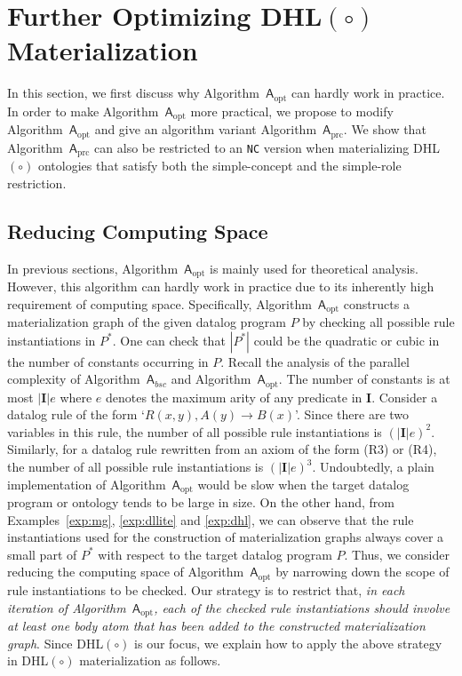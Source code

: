 \section{Further Optimizing DHL$(\circ)$ Materialization}
\label{sec:practicalAlg}

In this section, we first discuss why Algorithm~$\mathsf{A}_{\text{opt}}$ can hardly work in practice.
In order to make Algorithm~$\mathsf{A}_{\text{opt}}$ more practical,
we propose to modify Algorithm~$\mathsf{A}_{\text{opt}}$ and give an algorithm variant Algorithm~$\mathsf{A}_{\text{prc}}$.
We show that Algorithm~$\mathsf{A}_{\text{prc}}$ can also be restricted to an \texttt{NC} version
when materializing DHL$(\circ)$ ontologies that satisfy both the simple-concept
and the simple-role restriction.

\subsection{Reducing Computing Space}

In previous sections, Algorithm~$\mathsf{A}_{\text{opt}}$ is mainly used for theoretical analysis.
However, this algorithm can hardly work in practice due to its inherently
high requirement of computing space. Specifically,
Algorithm~$\mathsf{A}_{\text{opt}}$ constructs a materialization graph of the given
datalog program $P$ by checking all possible rule
instantiations in $P^*$.
One can check that $|P^*|$ could be the quadratic or cubic in the number of constants occurring in $P$.
Recall the analysis of the parallel complexity of Algorithm~$\mathsf{A}_{bsc}$ and Algorithm~$\mathsf{A}_{\text{opt}}$.
The number of constants is at most $|\textbf{I}|e$ where $e$ denotes the maximum arity of any predicate in $\textbf{I}$.
Consider a datalog rule of the form `$R(x,y),A(y)\rightarrow B(x)$'.
Since there are two variables in this rule, the number of all possible rule instantiations
is $(|\textbf{I}|e)^2$.
Similarly, for a datalog rule rewritten from an axiom of the form (R3) or (R4),
the number of all possible rule instantiations is $(|\textbf{I}|e)^3$.
Undoubtedly, a plain implementation of Algorithm~$\mathsf{A}_{\text{opt}}$ would be slow
when the target datalog program or ontology
tends to be large in size.
On the other hand, from Examples~\ref{exp:mg}, \ref{exp:dllite} and \ref{exp:dhl},
we can observe that the rule instantiations used for the construction
of materialization graphs always cover a small part of $P^*$ with respect to the target datalog program $P$.
Thus, we consider reducing the computing space of Algorithm~$\mathsf{A}_{\text{opt}}$
by narrowing down the scope of rule instantiations to be checked.
Our strategy is to restrict that, \emph{in each iteration of Algorithm~$\mathsf{A}_{\text{opt}}$,
each of the checked rule instantiations should involve at least one body atom that has been
added to the constructed materialization graph}.
Since DHL$(\circ)$
is our focus, we explain how to apply the above strategy in DHL$(\circ)$ materialization
as follows.

